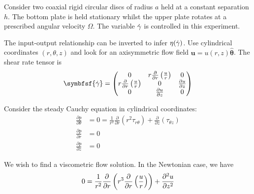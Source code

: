 \documentclass{jknotes}
\begin{document}
Consider two coaxial rigid circular discs of radius $a$ held at a constant separation
$h$. The bottom plate is held stationary whilst the upper plate rotates at a
prescribed angular velocity $\Omega$. The variable $\dot{\gamma}$ is controlled in
this experiment.

\begin{center}
\end{center}

The input-output relationship can be inverted to infer $\eta(\dot{\gamma})$. Use
cylindrical coordinates $(r, \theta, z)$ and look for an axisymmetric flow
field $\symbf{u} = u(r,z) \hat{\symbf{\theta}}$. The shear rate tensor is
\begin{equation}
	\symbfsf{\srate} = \begin{pmatrix} 0 & r\frac{\partial}{\partial r} \left(
		\frac{u}{r}\right) & 0 \\ r\frac{\partial}{\partial r} \left(
	\frac{u}{r}\right) & 0 & \frac{\partial u}{\partial z} \\
0 & \frac{\partial u}{\partial z} & 0 \end{pmatrix}
\end{equation}

Consider the steady Cauchy equation in cylindrical coordinates:
\begin{align}
	\frac{\partial p}{\partial \theta} &= 0 = \frac{1}{r^2} \frac{\partial
		}{\partial r} \left( r^2 \tau_{r\theta}\right) + \frac{\partial}{\partial
z}\left( \tau_{\theta z}\right) \\
\frac{\partial p}{\partial r} &= 0 \\ \frac{\partial p}{\partial z} &= 0
\end{align}


We wish to find a viscometric flow solution. In the Newtonian case, we have
\begin{equation}
	0 = \frac{1}{r^2} \frac{\partial
		}{\partial r} \left( r^3 \frac{\partial}{\partial r} \left(
	\frac{u}{r}\right)\right) + \frac{\partial^2 u}{\partial z^2}\\
\end{equation}
\end{document}
